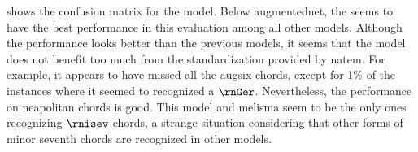 
 shows the confusion
matrix for the \textcite{mcleod2021modular} model. Below
\gls{augmentednet}, the \textcite{mcleod2021modular} seems
to have the best performance in this evaluation among all
other models. Although the performance looks better than the
previous models, it seems that the model does not benefit
too much from the standardization provided by \gls{natem}.
For example, it appears to have missed all the \gls{augsix}
chords, except for 1\% of the instances where it seemed to
recognized a $\rnGer$. Nevertheless, the performance on
\gls{neapolitan} chords is good. This model and
\gls{melisma} seem to be the only ones recognizing $\rnisev$
chords, a strange situation considering that other forms of
minor seventh chords are recognized in other models.

